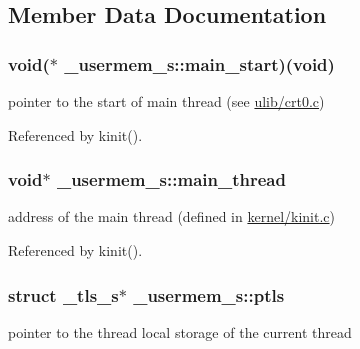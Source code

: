 \subsection{Member Data Documentation}
\hypertarget{struct__usermem__s_aeb4637b2b234d4b2b4c3963bc580b993}{
\subsubsection[{main\-\_\-start}]{\setlength{\rightskip}{0pt plus 5cm}void($\ast$  \-\_\-usermem\-\_\-s\-::main\-\_\-start)(void)}}\label{struct__usermem__s_aeb4637b2b234d4b2b4c3963bc580b993}


pointer to the start of main thread (see \hyperlink{crt0_8c}{ulib/crt0.\-c}) 



Referenced by kinit().

\hypertarget{struct__usermem__s_a72dc8dd0f2611deaef667aa2f9dbeb9f}{
\subsubsection[{main\-\_\-thread}]{\setlength{\rightskip}{0pt plus 5cm}void$\ast$ \-\_\-usermem\-\_\-s\-::main\-\_\-thread}}\label{struct__usermem__s_a72dc8dd0f2611deaef667aa2f9dbeb9f}


address of the main thread (defined in \hyperlink{kinit_8c}{kernel/kinit.\-c}) 



Referenced by kinit().

\hypertarget{struct__usermem__s_a092a5f4499ea31a3da83e6716d959626}{
\subsubsection[{ptls}]{\setlength{\rightskip}{0pt plus 5cm}struct {\bf \-\_\-tls\-\_\-s}$\ast$ \-\_\-usermem\-\_\-s\-::ptls}}\label{struct__usermem__s_a092a5f4499ea31a3da83e6716d959626}


pointer to the thread local storage of the current thread 



